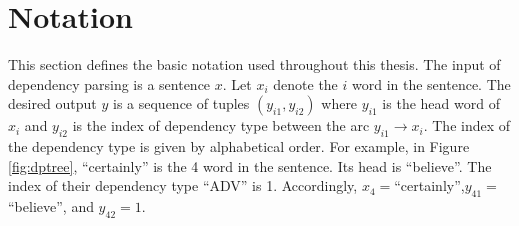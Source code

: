 \section{Notation}
\label{sec:Notations}
This section defines the basic notation used throughout this thesis. The input of dependency parsing is a sentence $x$. Let $x_i$ denote the $i$ word in the sentence. The desired output $y$ is a sequence of tuples $(y_{i1},y_{i2})$ where $y_{i1}$ is the head word of  $x_i$  and $y_{i2}$ is the index of dependency type between the arc $y_{i1}\rightarrow x_i$. The index of the dependency type is given by alphabetical order. For example, in Figure \ref{fig:dptree}, ``certainly'' is the 4 word in the sentence. Its head is ``believe''. The index of their dependency type ``ADV'' is 1. Accordingly, $x_4=$``certainly'',$y_{41}=$``believe'', and $y_{42}=1$.



